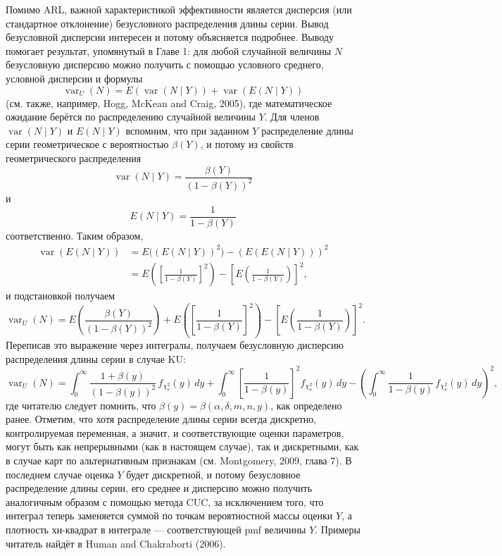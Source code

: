 Помимо ARL, важной характеристикой эффективности является дисперсия (или стандартное отклонение) безусловного распределения длины серии. Вывод безусловной дисперсии интересен и потому объясняется подробнее. Выводу помогает результат, упомянутый в Главе 1: для любой случайной величины \(N\) безусловную дисперсию можно получить с помощью условного среднего, условной дисперсии и формулы
\[
	\operatorname{var}_U(N) = E(\operatorname{var}(N \mid Y)) + \operatorname{var}(E(N \mid Y))
\]
(см. также, например, Hogg, McKean and Craig, 2005), где математическое ожидание берётся по распределению случайной величины \(Y\). Для членов \(\operatorname{var}(N \mid Y)\) и \(E(N \mid Y)\) вспомним, что при заданном \(Y\) распределение длины серии геометрическое с вероятностью \(\beta(Y)\), и потому из свойств геометрического распределения
\[
	\operatorname{var}(N \mid Y) = \frac{\beta(Y)}{(1 - \beta(Y))^2}
\]
и
\[
	E(N \mid Y) = \frac{1}{1 - \beta(Y)}
\]
соответственно. Таким образом,
\[
\begin{aligned}
	\operatorname{var}(E(N \mid Y))
	&= E\big((E(N \mid Y))^2\big) - (E(E(N \mid Y)))^2 \\
	&= E\left(\left[\frac{1}{1 - \beta(Y)}\right]^2\right)
	   - \left[E\left(\frac{1}{1 - \beta(Y)}\right)\right]^2,
\end{aligned}
\]
и подстановкой получаем
\[
\operatorname{var}_U(N) = E\left(\frac{\beta(Y)}{(1 - \beta(Y))^2}\right)
	+ E\left(\left[\frac{1}{1 - \beta(Y)}\right]^2\right)
	- \left[E\left(\frac{1}{1 - \beta(Y)}\right)\right]^2.
\]
Переписав это выражение через интегралы, получаем безусловную дисперсию распределения длины серии в случае KU:
\[
	\operatorname{var}_U(N) = \int_0^{\infty} \frac{1 + \beta(y)}{(1 - \beta(y))^2}\, f_{\chi^2_\nu}(y)\,dy
	+ \int_0^{\infty} \left[\frac{1}{1 - \beta(y)}\right]^2 f_{\chi^2_\nu}(y)\,dy
	- \left(\int_0^{\infty} \frac{1}{1 - \beta(y)}\, f_{\chi^2_\nu}(y)\,dy\right)^2,
\]
где читателю следует помнить, что \(\beta(y) = \beta(\alpha, \delta, m, n, y)\), как определено ранее. Отметим, что хотя распределение длины серии всегда дискретно, контролируемая переменная, а значит, и соответствующие оценки параметров, могут быть как непрерывными (как в настоящем случае), так и дискретными, как в случае карт по альтернативным признакам (см. Montgomery, 2009, глава 7). В последнем случае оценка \(Y\) будет дискретной, и потому безусловное распределение длины серии, его среднее и дисперсию можно получить аналогичным образом с помощью метода CUC, за исключением того, что интеграл теперь заменяется суммой по точкам вероятностной массы оценки \(Y\), а плотность хи-квадрат в интеграле — соответствующей pmf величины \(Y\). Примеры читатель найдёт в Human and Chakraborti (2006).

